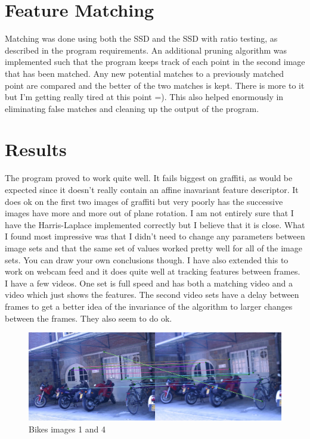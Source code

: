 \documentclass[10pt,twocolumn,letterpaper]{article}
\begin{document}
\section{Feature Matching}
Matching was done using both the SSD and the SSD with ratio testing, as described in the program requirements. An additional pruning algorithm was implemented such that the program keeps track of each point in the second image that has been matched. Any new potential matches to a previously matched point are compared and the better of the two matches is kept. There is more to it but I'm getting really tired at this point =). This also helped enormously in eliminating false matches and cleaning up the output of the program.

\section{Results}
The program proved to work quite well. It fails biggest on graffiti, as would be expected since it doesn't really contain an affine inavariant feature descriptor. It does ok on the first two images of graffiti but very poorly has the successive images have more and more out of plane rotation. I am not entirely sure that I have the Harris-Laplace implemented correctly but I believe that it is close. What I found most impressive was that I didn't need to change any parameters between image sets and that the same set of values worked pretty well for all of the image sets. You can draw your own conclusions though. I have also extended this to work on webcam feed and it does quite well at tracking features between frames. I have a few videos. One set is full speed and has both a matching video and a video which just shows the features. The second video sets have a delay between frames to get a better idea of the invariance of the algorithm to larger changes between the frames. They also seem to do ok.

\begin{figure}[ht!]
\centering
\includegraphics[width=1\textwidth]{img/bikes1_4_ratio.eps}
\caption{Bikes images 1 and 4}
\label{fig:bikes}
\end{figure}
\end{document}
